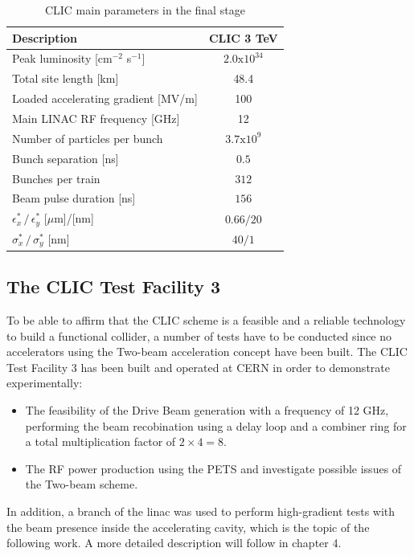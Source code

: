 \begin{table}[h]
  \centering
    \begin{tabular}{ l c  }
    \hline
    \hline
    \textbf{Description}						& \textbf{CLIC 3 TeV}	\\
    \hline
    Peak luminosity [cm$^{-2}$ s$^{-1}$]			& $2.0\text{x}10^{34}$	\\
    Total site length [km]						& 48.4				\\
    Loaded accelerating gradient [MV/m]			& 100	\\
    Main LINAC RF frequency	[GHz]			& 12	\\
    Number of particles per bunch				& $3.7\text{x}10^{9}$ \\
    Bunch separation [ns]						& $0.5$ \\
    Bunches per train							& $312$ \\
    Beam pulse duration [ns]					& $156$ \\
    $\epsilon^*_x \, / \, \epsilon^*_y$ [$\mu$m]/[nm]	& $0.66/20$ \\  
    $\sigma^*_x\, / \, \sigma^*_y$ [nm]			& $40/1$	\\
    
    \hline
    \hline
    \end{tabular}
  \caption{CLIC main parameters in the final stage}
\label{table_CLIC_params}
\end{table}







\subsection[CTF3]{The CLIC Test Facility 3}

To be able to affirm that the CLIC scheme is a feasible and a reliable technology to build a functional collider, a number of tests have to be conducted since no accelerators using the Two-beam acceleration concept have been built. The CLIC Test Facility 3 has been built and operated at CERN in order to demonstrate experimentally:

\begin{itemize}
\item The feasibility of the Drive Beam generation with a frequency of 12 GHz, performing the beam recobination using a delay loop and a combiner ring for a total multiplication factor of $2\times4 =8$.
\item The RF power production using the PETS and investigate possible issues of the Two-beam scheme.
\end{itemize}
In addition, a branch of the linac was used to perform high-gradient tests with the beam presence inside the accelerating cavity, which is the topic of the following work. A more detailed description will follow in chapter 4.
